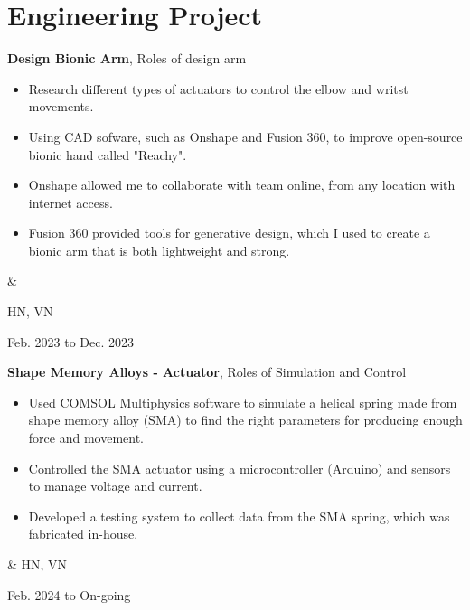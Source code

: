 \documentclass[10pt, letterpaper]{article}
\newenvironment{highlights}{
        \begin{itemize}[
                topsep=0pt,
                parsep=0.10 cm,
                partopsep=0pt,
                itemsep=0pt,
                after=\vspace{-1\baselineskip},
                leftmargin=0.4 cm + 3pt
            ]
    }{
        \end{itemize}
    } %
\let\originalTabularx\tabularx
\let\originalEndTabularx\endtabularx
\renewenvironment{tabularx}{\bgroup\centering\originalTabularx}{\originalEndTabularx\par\egroup}
\begin{document}
    \section{Engineering Project}

        \begin{tabularx}{
            \textwidth-0.4 cm-0.13cm
        }{
            K{0.2 cm}
            R{4.1 cm}
        }
            \textbf{Design Bionic Arm}, Roles of design arm

            \vspace{0.10 cm}

            \begin{highlights}
                \item Research different types of actuators to control the elbow and writst movements.
                \item Using CAD sofware, such as Onshape and Fusion 360, to improve open-source bionic hand called "Reachy".
                \item Onshape allowed me to collaborate with team online, from any location with internet access.
                \item Fusion 360 provided tools for generative design, which I used to create a bionic arm that is both lightweight and strong.
            \end{highlights}
            &

            HN, VN 
            
            Feb. 2023 to Dec. 2023

        \end{tabularx}

        \vspace{0.5 cm}
        \begin{tabularx}{
            \textwidth-0.4 cm-0.13cm
        }{
            K{0.2 cm}
            R{4.1 cm}
        }
            \textbf{Shape Memory Alloys - Actuator}, Roles of Simulation and Control

            \vspace{0.10 cm}

            \begin{highlights}
                \item Used COMSOL Multiphysics software to simulate a helical spring made from shape memory alloy (SMA) to find the right parameters for producing enough force and movement.
                \item Controlled the SMA actuator using a microcontroller (Arduino) and sensors to manage voltage and current.
                \item Developed a testing system to collect data from the SMA spring, which was fabricated in-house.
            \end{highlights}
            &
            HN, VN

            Feb. 2024 to On-going
        \end{tabularx}
\end{document}
